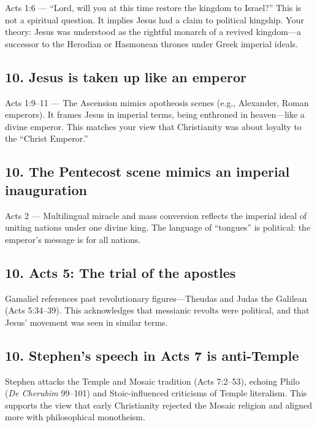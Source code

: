 Acts 1:6 --- ``Lord, will you at this time restore the kingdom to Israel?'' This is not a spiritual question.
It implies Jesus had a claim to political kingship.
Your theory: Jesus was understood as the rightful monarch of a revived kingdom---a successor to the Herodian or Hasmonean thrones under Greek imperial ideals.

\subsection{10.
Jesus is taken up like an emperor}\label{subsec:jesus-is-taken-up-like-an-emperor}

Acts 1:9--11 --- The Ascension mimics apotheosis scenes (e.g., Alexander, Roman emperors).
It frames Jesus in imperial terms, being enthroned in heaven---like a divine emperor.
This matches your view that Christianity was about loyalty to the ``Christ Emperor.''

\subsection{10.
The Pentecost scene mimics an imperial inauguration}\label{subsec:the-pentecost-scene-mimics-an-imperial-inauguration}

Acts 2 --- Multilingual miracle and mass conversion reflects the imperial ideal of uniting nations under one divine king.
The language of ``tongues'' is political: the emperor's message is for all nations.

\subsection{10.
Acts 5: The trial of the apostles}\label{subsec:acts-5-the-trial-of-the-apostles}

Gamaliel references past revolutionary figures---Theudas and Judas the Galilean (Acts 5:34--39).
This acknowledges that messianic revolts were political, and that Jesus' movement was seen in similar terms.

\subsection{10.
Stephen's speech in Acts 7 is anti-Temple}\label{subsec:stephens-speech-in-acts-7-is-anti-temple}

Stephen attacks the Temple and Mosaic tradition (Acts 7:2--53), echoing Philo (\emph{De Cherubim} 99--101) and Stoic-influenced criticisms of Temple literalism.
This supports the view that early Christianity rejected the Mosaic religion and aligned more with philosophical monotheism.

